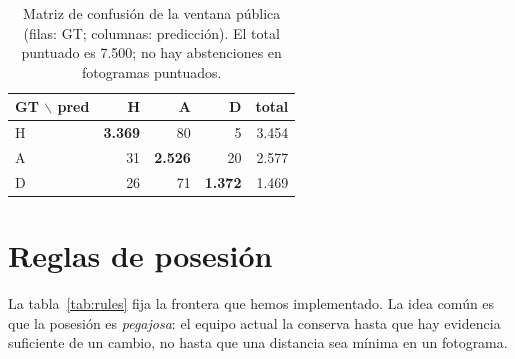 \documentclass[10pt,a4paper]{article}
\begin{document}
\begin{table}[t]
\centering
\small
\caption{Matriz de confusión de la ventana pública (filas: GT; columnas: predicción). El total
puntuado es 7.500; no hay abstenciones en fotogramas puntuados.}
\label{tab:confusion}
\begin{tabular}{lrrrr}
\toprule
GT $\backslash$ pred & H & A & D & total \\
\midrule
H & \textbf{3.369} & 80 & 5 & 3.454 \\
A & 31 & \textbf{2.526} & 20 & 2.577 \\
D & 26 & 71 & \textbf{1.372} & 1.469 \\
\bottomrule
\end{tabular}
\end{table}

\section{Reglas de posesión}
\label{sec:reglas}

La tabla~\ref{tab:rules} fija la frontera que hemos implementado. La idea común es que la
posesión es \emph{pegajosa}: el equipo actual la conserva hasta que hay evidencia suficiente de un
cambio, no hasta que una distancia sea mínima en un fotograma.
\end{document}
